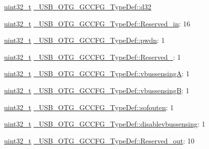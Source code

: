 \begin{DoxyCompactItemize}
\begin{tabbing}
\end{tabbing}\item 
\hyperlink{stdint_8h_a435d1572bf3f880d55459d9805097f62}{uint32\-\_\-t} \hyperlink{group___u_s_b___o_t_g___d_r_i_v_e_r_ga92b0a669aa19aa3f11506e615975328b}{\-\_\-\-U\-S\-B\-\_\-\-O\-T\-G\-\_\-\-G\-C\-C\-F\-G\-\_\-\-Type\-Def\-::d32}
\item 
\hyperlink{stdint_8h_a435d1572bf3f880d55459d9805097f62}{uint32\-\_\-t} \hyperlink{group___u_s_b___o_t_g___d_r_i_v_e_r_ga8242aeaf1ab3d3578762591e4df7f75f}{\-\_\-\-U\-S\-B\-\_\-\-O\-T\-G\-\_\-\-G\-C\-C\-F\-G\-\_\-\-Type\-Def\-::\-Reserved\-\_\-in}\-: 16
\item 
\hyperlink{stdint_8h_a435d1572bf3f880d55459d9805097f62}{uint32\-\_\-t} \hyperlink{group___u_s_b___o_t_g___d_r_i_v_e_r_ga453a175b65a6fc8f96db36e504304c2b}{\-\_\-\-U\-S\-B\-\_\-\-O\-T\-G\-\_\-\-G\-C\-C\-F\-G\-\_\-\-Type\-Def\-::pwdn}\-: 1
\item 
\hyperlink{stdint_8h_a435d1572bf3f880d55459d9805097f62}{uint32\-\_\-t} \hyperlink{group___u_s_b___o_t_g___d_r_i_v_e_r_gae0cd177212dfd31bf75e1eee2f58ded7}{\-\_\-\-U\-S\-B\-\_\-\-O\-T\-G\-\_\-\-G\-C\-C\-F\-G\-\_\-\-Type\-Def\-::\-Reserved\-\_}\-: 1
\item 
\hyperlink{stdint_8h_a435d1572bf3f880d55459d9805097f62}{uint32\-\_\-t} \hyperlink{group___u_s_b___o_t_g___d_r_i_v_e_r_gac18d70824581f11bbd03f2ef67b29b8d}{\-\_\-\-U\-S\-B\-\_\-\-O\-T\-G\-\_\-\-G\-C\-C\-F\-G\-\_\-\-Type\-Def\-::vbussensing\-A}\-: 1
\item 
\hyperlink{stdint_8h_a435d1572bf3f880d55459d9805097f62}{uint32\-\_\-t} \hyperlink{group___u_s_b___o_t_g___d_r_i_v_e_r_ga2be201bafae01439bca7d3c5c503e702}{\-\_\-\-U\-S\-B\-\_\-\-O\-T\-G\-\_\-\-G\-C\-C\-F\-G\-\_\-\-Type\-Def\-::vbussensing\-B}\-: 1
\item 
\hyperlink{stdint_8h_a435d1572bf3f880d55459d9805097f62}{uint32\-\_\-t} \hyperlink{group___u_s_b___o_t_g___d_r_i_v_e_r_gaee6a6008a6f826c15f2592bcba504bf8}{\-\_\-\-U\-S\-B\-\_\-\-O\-T\-G\-\_\-\-G\-C\-C\-F\-G\-\_\-\-Type\-Def\-::sofouten}\-: 1
\item 
\hyperlink{stdint_8h_a435d1572bf3f880d55459d9805097f62}{uint32\-\_\-t} \hyperlink{group___u_s_b___o_t_g___d_r_i_v_e_r_ga621c869741e314cdcdf1969b133e79af}{\-\_\-\-U\-S\-B\-\_\-\-O\-T\-G\-\_\-\-G\-C\-C\-F\-G\-\_\-\-Type\-Def\-::disablevbussensing}\-: 1
\item 
\hyperlink{stdint_8h_a435d1572bf3f880d55459d9805097f62}{uint32\-\_\-t} \hyperlink{group___u_s_b___o_t_g___d_r_i_v_e_r_gaca2c301103053094f91770ac5b6ddfc7}{\-\_\-\-U\-S\-B\-\_\-\-O\-T\-G\-\_\-\-G\-C\-C\-F\-G\-\_\-\-Type\-Def\-::\-Reserved\-\_\-out}\-: 10

\end{DoxyCompactItemize}
